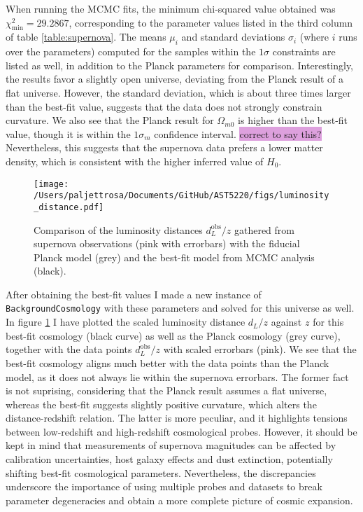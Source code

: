 \documentclass{aa}
\begin{document}
When running the MCMC fits, the minimum chi-squared value obtained was $\chi^2_\text{min}=29.2867$, corresponding to the parameter values listed in the third column of table \ref{table:supernova}. The means $\mu_i$ and standard deviations $\sigma_i$ (where $i$ runs over the parameters) computed for the samples within the $1\sigma$ constraints are listed as well, in addition to the Planck parameters for comparison. Interestingly, the results favor a slightly open universe, deviating from the Planck result of a flat universe. However, the standard deviation, which is about three times larger than the best-fit value, suggests that the data does not strongly constrain curvature. We also see that the Planck result for $\Omega_{m0}$ is higher than the best-fit value, though it is within the $1\sigma_m$ confidence interval. \colorbox{Plum}{correct to say this?} Nevertheless, this suggests that the supernova data prefers a lower matter density, which is consistent with the higher inferred value of $H_0$. 

\begin{figure}
    \centering
    \texttt{[image: /Users/paljettrosa/Documents/GitHub/AST5220/figs/luminosity\_distance.pdf]}
    \caption{Comparison of the luminosity distances $d_L^\text{obs}/z$ gathered from supernova observations (pink with errorbars) with the fiducial Planck model (grey) and the best-fit model from MCMC analysis (black).}\label{fig:luminosity distance}
\end{figure}

After obtaining the best-fit values I made a new instance of \verb|BackgroundCosmology| with these parameters and solved for this universe as well. In figure \ref{fig:luminosity distance} I have plotted the scaled luminosity distance $d_L/z$ against $z$ for this best-fit cosmology (black curve) as well as the Planck cosmology (grey curve), together with the data points $d_L^\text{obs}/z$ with scaled errorbars (pink). We see that the best-fit cosmology aligns much better with the data points than the Planck model, as it does not always lie within the supernova errorbars. The former fact is not suprising, considering that the Planck result assumes a flat universe, whereas the best-fit suggests slightly positive curvature, which alters the distance-redshift relation. The latter is more peculiar, and it highlights tensions between low-redshift and high-redshift cosmological probes. However, it should be kept in mind that measurements of supernova magnitudes can be affected by calibration uncertainties, host galaxy effects and dust extinction, potentially shifting best-fit cosmological parameters. Nevertheless, the discrepancies underscore the importance of using multiple probes and datasets to break parameter degeneracies and obtain a more complete picture of cosmic expansion.
\end{document}
